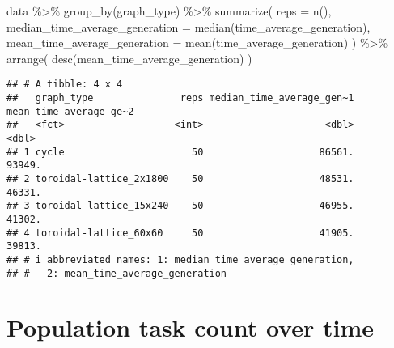 \documentclass[
]{book}
\newenvironment{Shaded}{\begin{snugshade}}{\end{snugshade}}
\newcommand{\AttributeTok}[1]{\textcolor[rgb]{0.77,0.63,0.00}{#1}}
\newcommand{\FunctionTok}[1]{\textcolor[rgb]{0.00,0.00,0.00}{#1}}
\newcommand{\NormalTok}[1]{#1}
\newcommand{\SpecialCharTok}[1]{\textcolor[rgb]{0.00,0.00,0.00}{#1}}
\begin{document}
\begin{Shaded}
\begin{Highlighting}[]
\NormalTok{data }\SpecialCharTok{\%\textgreater{}\%}
  \FunctionTok{group\_by}\NormalTok{(graph\_type) }\SpecialCharTok{\%\textgreater{}\%}
  \FunctionTok{summarize}\NormalTok{(}
    \AttributeTok{reps =} \FunctionTok{n}\NormalTok{(),}
    \AttributeTok{median\_time\_average\_generation =} \FunctionTok{median}\NormalTok{(time\_average\_generation),}
    \AttributeTok{mean\_time\_average\_generation =} \FunctionTok{mean}\NormalTok{(time\_average\_generation)}
\NormalTok{  ) }\SpecialCharTok{\%\textgreater{}\%}
  \FunctionTok{arrange}\NormalTok{(}
    \FunctionTok{desc}\NormalTok{(mean\_time\_average\_generation)}
\NormalTok{  )}
\end{Highlighting}
\end{Shaded}

\begin{verbatim}
## # A tibble: 4 x 4
##   graph_type               reps median_time_average_gen~1 mean_time_average_ge~2
##   <fct>                   <int>                     <dbl>                  <dbl>
## 1 cycle                      50                    86561.                 93949.
## 2 toroidal-lattice_2x1800    50                    48531.                 46331.
## 3 toroidal-lattice_15x240    50                    46955.                 41302.
## 4 toroidal-lattice_60x60     50                    41905.                 39813.
## # i abbreviated names: 1: median_time_average_generation,
## #   2: mean_time_average_generation
\end{verbatim}

\hypertarget{population-task-count-over-time-1}{%
\section{Population task count over time}\label{population-task-count-over-time-1}}
\end{document}
